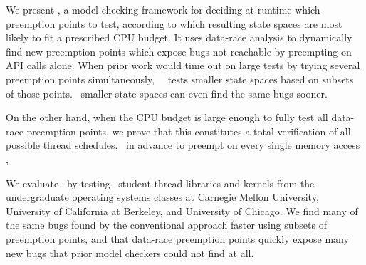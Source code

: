 We present \quicksand,
a model checking framework for deciding at runtime which preemption points to test,
according to which resulting state spaces are most likely to fit a prescribed CPU budget.
It uses data-race analysis \cite{eraser} to dynamically find new preemption points which expose bugs not reachable by preempting on API calls alone.
When prior work would time out on large tests by trying several preemption points simultaneously,
\quicksand~~tests smaller state spaces based on subsets of those points.
~smaller state spaces can even find the same bugs sooner.

On the other hand, when the CPU budget is large enough to fully test all data-race preemption points,
we prove that this constitutes a total verification of all possible thread schedules.
~in advance to preempt on every single memory access \cite{spin}, 


We evaluate \quicksand~by testing \numstudence~student thread libraries and kernels from the undergraduate operating systems classes at Carnegie Mellon University, University of California at Berkeley, and University of Chicago.
We find many of the same bugs found by the conventional approach faster using subsets of preemption points,
and that data-race preemption points quickly expose many new bugs that prior model checkers could not find at all.

